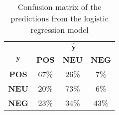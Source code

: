\begin{table}[!ht]
	\centering
	\begin{tabular}{cccc}
		\toprule
		& \multicolumn{3}{c}{$\bm{\hat{y}}$}\\ 
		\cmidrule(lr){2-4}
		\textbf{$\bm{y}$} & \textbf{POS} & \textbf{NEU} & \textbf{NEG} \\
		\midrule
		\textbf{POS} & 67\% & 26\% & 7\% \\
		\textbf{NEU} & 20\% & 73\% & 6\% \\
		\textbf{NEG} & 23\% & 34\% & 43\% \\
		\bottomrule
	\end{tabular}
	\caption{Confusion matrix of the predictions from the logistic regression model}
	\label{table-confusion-matrix}
\end{table}